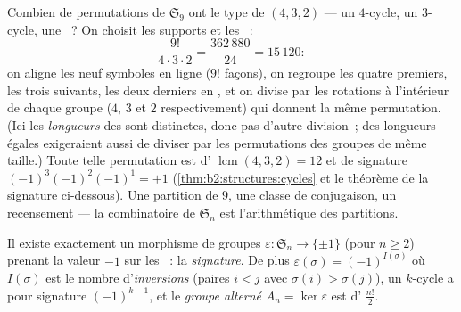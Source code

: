 \begin{example}\label{ex:b2:structures:cycletype}
Combien de permutations de $\mathfrak{S}_9$ ont le type de 
$(4, 3, 2)$ --- un $4$-cycle, un $3$-cycle, une ~?
On choisit les supports et les  ~:
\[
\frac{9!}{4\cdot 3\cdot 2}
= \frac{362\,880}{24} = 15\,120 :
\]
on aligne les neuf symboles en ligne ($9!$ façons), on regroupe
les quatre premiers, les trois suivants, les deux derniers en
, et on divise par les rotations à l'intérieur de chaque
groupe ($4$, $3$ et $2$ respectivement) qui donnent la même
permutation. (Ici les \emph{longueurs} des  sont distinctes,
donc pas d'autre division~; des longueurs égales exigeraient aussi
de diviser par les permutations des groupes de même taille.) Toute
telle permutation est d' $\operatorname{lcm}(4,3,2) = 12$ et
de signature $(-1)^3(-1)^2(-1)^1 = +1$
(\cref{thm:b2:structures:cycles} et le théorème de la signature
ci-dessous). Une partition de $9$, une classe de conjugaison, un
recensement --- la combinatoire de $\mathfrak{S}_n$ est
l'arithmétique des partitions.
\end{example}

\begin{theorem}[Signature]\label{thm:b2:structures:signature}
Il existe exactement un morphisme de groupes $\varepsilon \colon
\mathfrak{S}_n \to \{\pm 1\}$ (pour $n \geq 2$) prenant la valeur $-1$
sur les ~: la \emph{signature}. De plus
$\varepsilon(\sigma) = (-1)^{I(\sigma)}$ où $I(\sigma)$ est le nombre
d'\emph{inversions} (paires $i < j$ avec $\sigma(i) > \sigma(j)$), un
$k$-cycle a pour signature $(-1)^{k-1}$, et le \emph{groupe alterné}
$A_n = \ker\varepsilon$ est d' $\frac{n!}{2}$.
\end{theorem}

